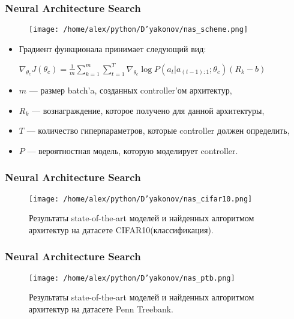 \documentclass[fleqn, xcolor=x11names]{beamer}
\begin{document}
\begin{frame}[fragile]\frametitle{Neural Architecture Search}

\begin{figure}[h]
\begin{center}
\texttt{[image: /home/alex/python/D'yakonov/nas\_scheme.png]}
\end{center}
\end{figure}

{\footnotesize

\begin{itemize}

\item Градиент функционала принимает следующий вид:
\begin{center}
$ \nabla_{\theta_c} J(\theta_c) = \frac{1}{m}\sum \limits_{k=1}^m  \sum \limits_{t=1}^T \nabla_{\theta_c} \log{P(a_t | a_{(t-1):1}; \theta_c)}(R_k-b)$
\end{center}

\item $m$ --- размер batch'a, созданных controller'ом архитектур, 

\item $R_k$ --- вознаграждение, которое получено для данной архитектуры, 

\item $T$ --- количество гиперпараметров, которые controller должен определить,

\item $P$ --- вероятностная модель, которую моделирует controller.
\end{itemize} 
}


\end{frame}





\begin{frame}\frametitle{Neural Architecture Search}

\begin{figure}[h]
\begin{center}
\texttt{[image: /home/alex/python/D'yakonov/nas\_cifar10.png]}
\caption{Результаты state-of-the-art моделей и найденных алгоритмом архитектур на датасете CIFAR10(классификация).}
\end{center}
\end{figure}

\end{frame}


\begin{frame}\frametitle{Neural Architecture Search}

\begin{figure}[h]
\begin{center}
\texttt{[image: /home/alex/python/D'yakonov/nas\_ptb.png]}
\caption{Результаты state-of-the-art моделей и найденных алгоритмом архитектур на датасете  Penn Treebank.}
\end{center}
\end{figure}

\end{frame}
\end{document}
